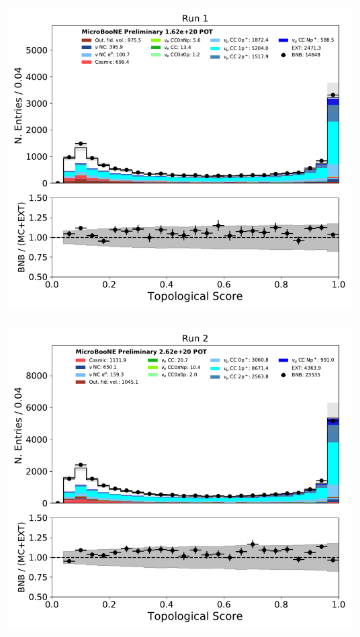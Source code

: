\begin{figure}[hbt!] 
\begin{center}
    \begin{subfigure}[b]{0.35\textwidth}
        \centering
        \includegraphics[width=1.00\textwidth]{NuMuCCsel/Images/Ryan/Run1/topological_score_08072020_fullsel_samples_longest_noCRT_event_category.pdf}
    \end{subfigure}
    \begin{subfigure}[b]{0.35\textwidth}
        \centering
        \includegraphics[width=1.00\textwidth]{NuMuCCsel/Images/Ryan/Run2/topological_score_08072020_fullsel_samples_longest_noCRT_event_category.pdf}

\end{subfigure}
\end{center}
\end{figure}
